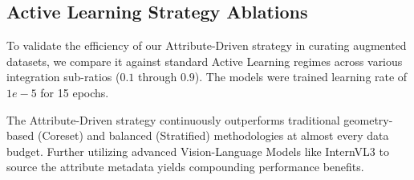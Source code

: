 \documentclass{article}
\begin{document}
\subsection{Active Learning Strategy Ablations}

To validate the efficiency of our Attribute-Driven strategy in curating augmented datasets, we compare it against standard Active Learning regimes across various integration sub-ratios ($0.1$ through $0.9$). The models were trained learning rate of $1e-5$ for 15 epochs. 

\begin{table}[h]
\caption{Comparison of Top-Performing Selection Strategies on ImageNet (ResNet-18) at various subset sampling ratios. Our Attribute strategy utilizes generated captions from LLMs (BLIP, Qwen3, InternVL3).}
\centering
{}
\end{table}

The Attribute-Driven strategy continuously outperforms traditional geometry-based (Coreset) and balanced (Stratified) methodologies at almost every data budget. Further utilizing advanced Vision-Language Models like InternVL3 to source the attribute metadata yields compounding performance benefits.
\end{document}
